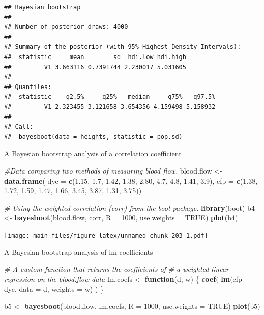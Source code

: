 \documentclass[]{book}
\newenvironment{Shaded}{\begin{snugshade}}{\end{snugshade}}
\newcommand{\KeywordTok}[1]{\textcolor[rgb]{0.13,0.29,0.53}{\textbf{#1}}}
\newcommand{\DataTypeTok}[1]{\textcolor[rgb]{0.13,0.29,0.53}{#1}}
\newcommand{\DecValTok}[1]{\textcolor[rgb]{0.00,0.00,0.81}{#1}}
\newcommand{\FloatTok}[1]{\textcolor[rgb]{0.00,0.00,0.81}{#1}}
\newcommand{\StringTok}[1]{\textcolor[rgb]{0.31,0.60,0.02}{#1}}
\newcommand{\CommentTok}[1]{\textcolor[rgb]{0.56,0.35,0.01}{\textit{#1}}}
\newcommand{\OtherTok}[1]{\textcolor[rgb]{0.56,0.35,0.01}{#1}}
\newcommand{\ControlFlowTok}[1]{\textcolor[rgb]{0.13,0.29,0.53}{\textbf{#1}}}
\newcommand{\OperatorTok}[1]{\textcolor[rgb]{0.81,0.36,0.00}{\textbf{#1}}}
\newcommand{\NormalTok}[1]{#1}
\begin{document}
\begin{verbatim}
## Bayesian bootstrap
## 
## Number of posterior draws: 4000 
## 
## Summary of the posterior (with 95% Highest Density Intervals):
##  statistic     mean        sd  hdi.low hdi.high
##         V1 3.663116 0.7391744 2.230017 5.031605
## 
## Quantiles:
##  statistic    q2.5%     q25%   median     q75%   q97.5%
##         V1 2.323455 3.121658 3.654356 4.159498 5.158932
## 
## Call:
##  bayesboot(data = heights, statistic = pop.sd)
\end{verbatim}

A Bayesian bootstrap analysis of a correlation coefficient

\begin{Shaded}
\begin{Highlighting}[]
\CommentTok{#Data comparing two methods of measuring blood flow.}
\NormalTok{blood.flow <-}\StringTok{ }\KeywordTok{data.frame}\NormalTok{(}
  \DataTypeTok{dye =} \KeywordTok{c}\NormalTok{(}\FloatTok{1.15}\NormalTok{, }\FloatTok{1.7}\NormalTok{, }\FloatTok{1.42}\NormalTok{, }\FloatTok{1.38}\NormalTok{, }\FloatTok{2.80}\NormalTok{, }\FloatTok{4.7}\NormalTok{, }\FloatTok{4.8}\NormalTok{, }\FloatTok{1.41}\NormalTok{, }\FloatTok{3.9}\NormalTok{),}
  \DataTypeTok{efp =} \KeywordTok{c}\NormalTok{(}\FloatTok{1.38}\NormalTok{, }\FloatTok{1.72}\NormalTok{, }\FloatTok{1.59}\NormalTok{, }\FloatTok{1.47}\NormalTok{, }\FloatTok{1.66}\NormalTok{, }\FloatTok{3.45}\NormalTok{, }\FloatTok{3.87}\NormalTok{, }\FloatTok{1.31}\NormalTok{, }\FloatTok{3.75}\NormalTok{))}

\CommentTok{# Using the weighted correlation (corr) from the boot package.}
\KeywordTok{library}\NormalTok{(boot)}
\NormalTok{b4 <-}\StringTok{ }\KeywordTok{bayesboot}\NormalTok{(blood.flow, corr, }\DataTypeTok{R =} \DecValTok{1000}\NormalTok{, }\DataTypeTok{use.weights =} \OtherTok{TRUE}\NormalTok{)}
\KeywordTok{plot}\NormalTok{(b4)}
\end{Highlighting}
\end{Shaded}

\texttt{[image: main\_files/figure-latex/unnamed-chunk-203-1.pdf]}

A Bayesian bootstrap analysis of lm coefficients

\begin{Shaded}
\begin{Highlighting}[]
\CommentTok{# A custom function that returns the coefficients of}
\CommentTok{# a weighted linear regression on the blood.flow data}
\NormalTok{lm.coefs <-}\StringTok{ }\ControlFlowTok{function}\NormalTok{(d, w) \{}
  \KeywordTok{coef}\NormalTok{( }\KeywordTok{lm}\NormalTok{(efp }\OperatorTok{~}\StringTok{ }\NormalTok{dye, }\DataTypeTok{data =}\NormalTok{ d, }\DataTypeTok{weights =}\NormalTok{ w) )}
\NormalTok{\}}

\NormalTok{b5 <-}\StringTok{ }\KeywordTok{bayesboot}\NormalTok{(blood.flow, lm.coefs, }\DataTypeTok{R =} \DecValTok{1000}\NormalTok{, }\DataTypeTok{use.weights =} \OtherTok{TRUE}\NormalTok{)}
\KeywordTok{plot}\NormalTok{(b5)}
\end{Highlighting}
\end{Shaded}
\end{document}
